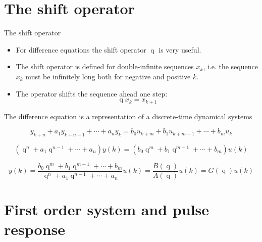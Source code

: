 \documentclass[presentation,aspectratio=1610]{beamer}
\DeclareMathOperator{\shift}{q}
\begin{document}
\section{The shift operator}
\label{sec-2}
\begin{frame}[label=sec-2-1]{The shift operator}
\begin{itemize}
\item For difference equations the shift operator \(\shift\) is very useful.
\item The shift operator is defined for double-infinite sequences $x_k$, i.e. the sequence $x_k$ must be infinitely long both for negative and positive $k$.
\item The operator shifts the sequence ahead one step:
\[ \shift x_k = x_{k+1} \]
\end{itemize}
\end{frame}

\begin{frame}[label=sec-2-2]{The difference equation is a representation of a discrete-time dynamical systems}
\begin{center}
\end{center}

\[ y_{k+n} + a_1 y_{k+n-1} + \cdots + a_n y_k =  b_0 u_{k+m} + b_1 u_{k+m-1} + \cdots + b_m u_k \]

\[ \left( \shift^n + a_1 \shift^{n-1} + \cdots + a_n \right) y(k) = \left( b_0 \shift^m + b_1\shift^{m-1} + \cdots + b_m \right)  u(k) \]

\[ y(k) = \frac{b_0 \shift^m + b_1\shift^{m-1} + \cdots + b_m}{ \shift^n + a_1 \shift^{n-1} + \cdots + a_n} u(k) = \frac{B(\shift)}{A(\shift)} u(k) = G(\shift) u(k) \]
\end{frame}

\section{First order system and pulse response}
\label{sec-3}
\end{document}
